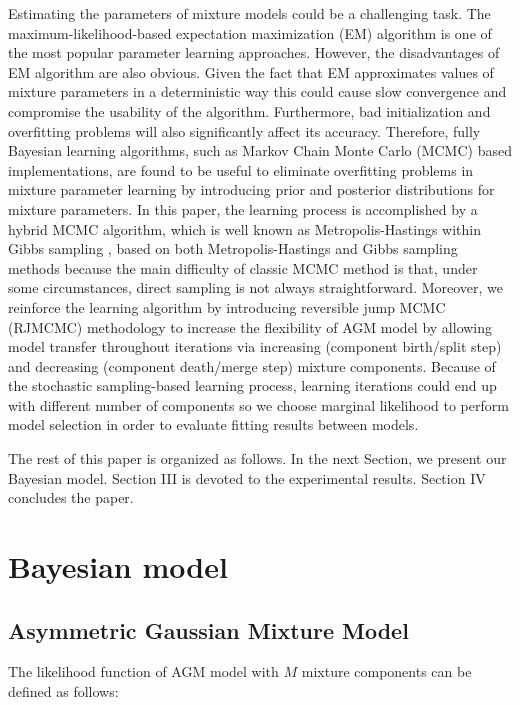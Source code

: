\documentclass[conference]{IEEEtran}
\begin{document}
Estimating the parameters of mixture models could be a challenging task. The maximum-likelihood-based expectation maximization (EM) \cite{Dempster1977} algorithm is one of the most popular parameter learning approaches. However, the disadvantages of EM algorithm are also obvious. Given the fact that EM approximates values of mixture parameters in a deterministic way this could cause slow convergence and compromise the usability of the algorithm. Furthermore, bad initialization and overfitting problems\cite{Bouguila2009} \cite{Bouguila2012} will also significantly affect its accuracy. Therefore, fully Bayesian learning algorithms, such as Markov Chain Monte Carlo (MCMC) based implementations, are found to be useful to eliminate overfitting problems in mixture parameter learning by introducing prior and posterior distributions for mixture parameters. In this paper, the learning process is accomplished by a hybrid MCMC algorithm, which is well known as Metropolis-Hastings within Gibbs sampling \cite{Bouguila2009}\cite{Bourouis2014}, based on both Metropolis-Hastings \cite{Hastings1970} and Gibbs sampling \cite{Geman1987} methods because the main difficulty of classic MCMC method is that, under some circumstances, direct sampling is not always straightforward. Moreover, we reinforce the learning algorithm by introducing reversible jump MCMC (RJMCMC)\cite{Bouguila2012} methodology to increase the flexibility of AGM model by allowing model transfer throughout iterations via increasing (component birth/split step) and decreasing (component death/merge step) mixture components. Because of the stochastic sampling-based learning process, learning iterations could end up with different number of components so we choose marginal likelihood\cite{Bouguila2009} to perform model selection in order to evaluate fitting results between models.

The rest of this paper is organized as follows. In the next Section, we present our Bayesian model. Section III is devoted to the experimental results. Section IV concludes the paper.


\section{Bayesian model}
\subsection{Asymmetric Gaussian Mixture Model}
The likelihood function of AGM model\cite{Elguebaly2014} with $M$ mixture components can be defined as follows:
\end{document}

